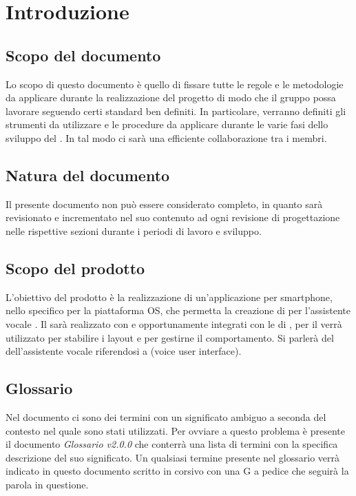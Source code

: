 \section{Introduzione}
\label{sec:intro}
\subsection{Scopo del documento}
Lo scopo di questo documento è quello di fissare tutte le regole e le metodologie da applicare durante la realizzazione del progetto di modo che il gruppo possa lavorare seguendo certi standard ben definiti. In particolare, verranno definiti gli strumenti da utilizzare e le procedure da applicare durante le varie fasi dello sviluppo del . In tal modo ci sarà una efficiente collaborazione tra i membri.
\subsection{Natura del documento}
Il presente documento non può essere considerato completo, in quanto sarà revisionato e incrementato nel suo contenuto ad ogni revisione di progettazione nelle rispettive sezioni durante i periodi di lavoro e sviluppo.
\subsection{Scopo del prodotto}
L'obiettivo del prodotto è la realizzazione di un'applicazione per smartphone, nello specifico per la piattaforma  OS, che permetta la creazione di  per l'assistente vocale  . Il  sarà realizzato con  e  opportunamente integrati con le  di , per il  verrà utilizzato  per stabilire i layout e  per gestirne il comportamento. Si parlerà del  dell'assistente vocale riferendosi a (voice user interface).
\subsection{Glossario}
Nel documento ci sono dei termini con un significato ambiguo a seconda del contesto nel quale sono stati utilizzati. Per ovviare a questo problema è presente il documento \emph{Glossario v2.0.0} che conterrà una lista di termini con la specifica descrizione del suo significato. Un qualsiasi termine presente nel glossario verrà indicato in questo documento scritto in corsivo con una G a pedice che seguirà la parola in questione.
